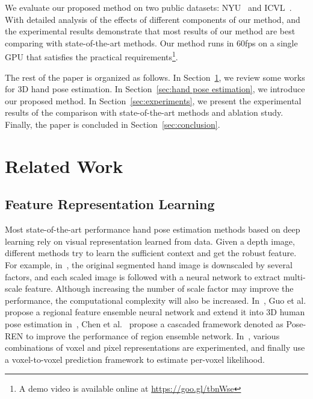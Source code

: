 \documentclass[journal,comsoc]{IEEEtran}
\begin{document}
We evaluate our proposed method on two public datasets: NYU~\cite{tompson2014real} and ICVL~\cite{sun2015cascaded}.
With detailed analysis of the effects of different components of our method, and the
experimental results demonstrate that most results of our method are best
comparing with state-of-the-art methods. Our method runs in 60fps on a single
GPU that satisfies the practical requirements\footnote{A demo video is available online at
\url{https://goo.gl/tbnWse}}.

The rest of the paper is organized as follows. In Section~\ref{sec:related work}, we review some works for 3D hand pose estimation.
In Section~\ref{sec:hand pose estimation}, we introduce our proposed method. In Section~\ref{sec:experiments},
we present the experimental results of the comparison with state-of-the-art methods and ablation study.
Finally, the paper is concluded in Section~\ref{sec:conclusion}.

\section{Related Work}\label{sec:related work}
\subsection{Feature Representation Learning}\label{sec:representation learning}
Most state-of-the-art performance hand pose estimation methods based on deep learning rely on visual
representation learned from data. Given a depth image, different methods try to learn the
sufficient context and get the robust feature. For example, in~\cite{oberweger2015hands}, the original segmented
hand image is downscaled by several factors, and each scaled image is followed with a neural
network to extract multi-scale feature. Although increasing the number of scale factor may
improve the performance, the computational complexity will also be increased.
In~\mbox{\cite{guo2017region}}, Guo et al. propose a regional feature ensemble neural network and extend it into
3D human pose estimation in~\mbox{\cite{wang2018region}}, Chen et al.~\mbox{\cite{chen2017pose}} propose a cascaded
framework denoted as Pose-REN to improve the performance of region ensemble network. In~\mbox{\cite{Moon_2018_CVPR_V2V-PoseNet}},
various combinations of voxel and pixel representations are experimented, and finally use a voxel-to-voxel prediction framework
to estimate per-voxel likelihood.
\end{document}
